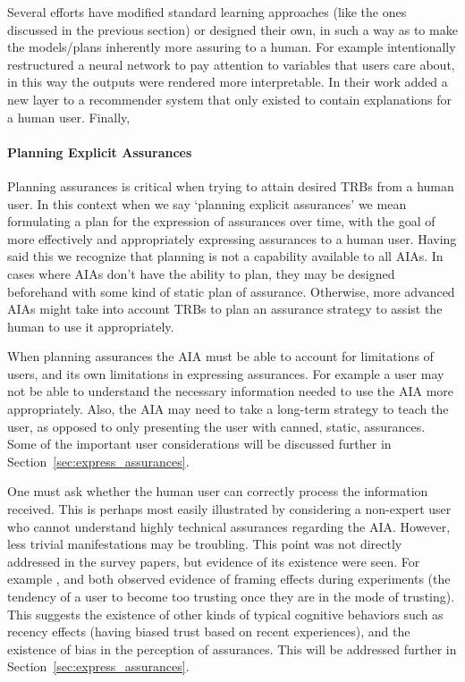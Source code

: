     Several efforts have modified standard learning approaches (like the ones discussed in the previous section) or designed their own, in such a way as to make the models/plans inherently more assuring to a human. For example \cite{Choi2016-by} intentionally restructured a neural network to pay attention to variables that users care about, in this way the outputs were rendered more interpretable. In their work \cite{Abdollahi2016-vn} added a new layer to a recommender system that only existed to contain explanations for a human user. Finally, \cite{Jovanovic2016-gw,Swartout1983-ko} 

    \paragraph{Planning Explicit Assurances} Planning assurances is critical when trying to attain desired TRBs from a human user. In this context when we say `planning explicit assurances' we mean formulating a plan for the expression of assurances over time, with the goal of more effectively and appropriately expressing assurances to a human user. Having said this we recognize that planning is not a capability available to all AIAs. In cases where AIAs don't have the ability to plan, they may be designed beforehand with some kind of static plan of assurance. Otherwise, more advanced AIAs might take into account TRBs to plan an assurance strategy to assist the human to use it appropriately.

    When planning assurances the AIA must be able to account for limitations of users, and its own limitations in expressing assurances. For example a user may not be able to understand the necessary information needed to use the AIA more appropriately. Also, the AIA may need to take a long-term strategy to teach the user, as opposed to only presenting the user with canned, static, assurances. Some of the important user considerations will be discussed further in Section~\ref{sec:express_assurances}.
    
    One must ask whether the human user can correctly process the information received. This is perhaps most easily illustrated by considering a non-expert user who cannot understand highly technical assurances regarding the AIA. However, less trivial manifestations may be troubling. This point was not directly addressed in the survey papers, but evidence of its existence were seen. For example \cite{Riley1996-qm}, and \cite{Freedy2007-sg} both observed evidence of framing effects during experiments (the tendency of a user to become too trusting once they are in the mode of trusting). This suggests the existence of other kinds of typical cognitive behaviors such as recency effects (having biased trust based on recent experiences), and the existence of bias in the perception of assurances. This will be addressed further in Section~\ref{sec:express_assurances}.


